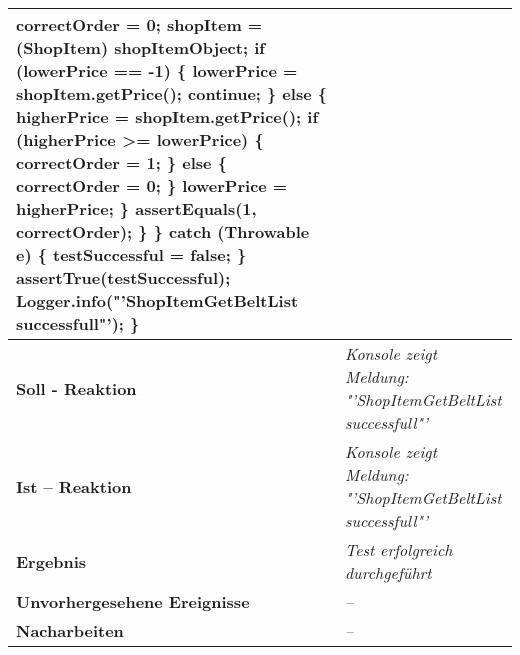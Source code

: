 \begin{longtable}{|p{4cm}|p{11cm}|}
{\hspace*{5mm}correctOrder = 0;\newline
\hspace*{5mm}shopItem = (ShopItem) shopItemObject;\newline
\hspace*{5mm}if (lowerPrice == -1) \{\newline
\hspace*{7mm}lowerPrice = shopItem.getPrice();\newline
\hspace*{7mm}continue;\newline
\hspace*{5mm}\} else \{\newline
\hspace*{7mm}higherPrice = shopItem.getPrice();\newline
\hspace*{7mm}if (higherPrice >= lowerPrice) \{\newline
\hspace*{9mm}correctOrder = 1;\newline
\hspace*{7mm}\} else \{\newline
\hspace*{9mm}correctOrder = 0;\newline
\hspace*{7mm}\}\newline
\hspace*{7mm}lowerPrice = higherPrice;\newline
\hspace*{5mm}\}\newline
\hspace*{5mm}assertEquals(1, correctOrder);\newline
\hspace*{3mm}\}\newline
\hspace*{1mm}\} catch (Throwable e) \{ \newline
\hspace*{3mm}testSuccessful = false; \newline 
\hspace*{1mm}\} \newline
\hspace*{1mm}assertTrue(testSuccessful);\newline
\hspace*{1mm}Logger.info("'ShopItemGetBeltList successfull"');\newline
\}
} \\
\hline
\textbf{Soll - Reaktion} & \textit{Konsole zeigt Meldung: "'ShopItemGetBeltList successfull"'
} \\
\hline
\textbf{Ist -- Reaktion} & \textit{Konsole zeigt Meldung: "'ShopItemGetBeltList successfull"'
} \\
\hline
\textbf{Ergebnis} & \textit{Test erfolgreich durchgeführt} \\
\hline
\textbf{Unvorhergesehene Ereignisse} &
\textit{--} \\
\hline
\textbf{Nacharbeiten } & \textit{--} \\
\hline
\end{longtable}